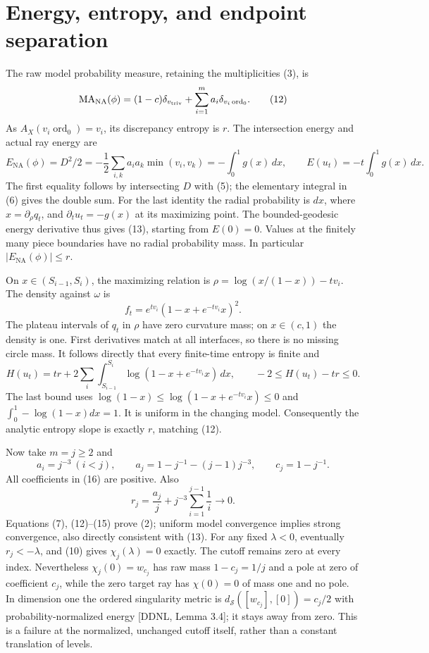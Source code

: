 \documentclass[11pt]{article}
\newcommand{\MA}{\operatorname{MA}}
\newcommand{\NA}{\mathrm{NA}}
\newcommand{\ord}{\operatorname{ord}}
\begin{document}
\section{Energy, entropy, and endpoint separation}
The raw model probability measure, retaining the multiplicities (3), is
\[
 \MA_\NA(\phi)=(1-c)\delta_{v_{\rm triv}}
                       +\sum_{i=1}^m a_i\delta_{v_i\ord_0}.
 \tag{12}
\]
As $A_X(v_i\ord_0)=v_i$, its discrepancy entropy is $r$.
The intersection energy and actual ray energy are
\[
 E_\NA(\phi)=D^2/2
    =-\frac12\sum_{i,k}a_ia_k\min(v_i,v_k)
    =-\int_0^1g(x)\,dx,
 \qquad E(u_t)=-t\int_0^1g(x)\,dx .                    \tag{13}
\]
The first equality follows by intersecting $D$ with (5);
the elementary integral in (6) gives the double sum.
For the last identity the radial probability is $dx$, where
$x=\partial_\rho q_t$, and $\partial_tu_t=-g(x)$ at its maximizing
point. The bounded-geodesic energy derivative thus gives (13), starting
from $E(0)=0$. Values at the finitely many piece boundaries have no
radial probability mass. In particular $|E_\NA(\phi)|\leq r$.

On $x\in(S_{i-1},S_i)$, the maximizing relation is
$\rho=\log(x/(1-x))-tv_i$. The density against $\omega$ is
\[
 f_t=e^{tv_i}(1-x+e^{-tv_i}x)^2.                         \tag{14}
\]
The plateau intervals of $q_t$ in $\rho$ have zero curvature mass;
on $x\in(c,1)$ the density is one. First derivatives match at all
interfaces, so there is no missing circle mass. It follows directly
that every finite-time entropy is finite and
\[
 H(u_t)=tr+2\sum_i\int_{S_{i-1}}^{S_i}
                       \log(1-x+e^{-tv_i}x)\,dx,
 \qquad -2\leq H(u_t)-tr\leq0.                          \tag{15}
\]
The last bound uses $\log(1-x)\leq\log(1-x+e^{-tv_i}x)\leq0$
and $\int_0^1-\log(1-x)dx=1$. It is uniform in the changing model.
Consequently the analytic entropy slope is exactly $r$, matching (12).

Now take $m=j\geq2$ and
\[
 a_i=j^{-3}\ (i<j),\qquad
 a_j=1-j^{-1}-(j-1)j^{-3},\qquad c_j=1-j^{-1}.           \tag{16}
\]
All coefficients in (16) are positive. Also
\[
 r_j=\frac{a_j}{j}+j^{-3}\sum_{i=1}^{j-1}\frac1i\to0.
\]
Equations (7), (12)--(15) prove (2); uniform model convergence implies
strong convergence, also directly consistent with (13).
For any fixed $\lambda<0$, eventually $r_j<-\lambda$, and (10) gives
$\chi_j(\lambda)=0$ exactly. The cutoff remains zero at every index.
Nevertheless $\chi_j(0)=w_{c_j}$ has raw mass $1-c_j=1/j$ and
a pole at zero of coefficient $c_j$, while the zero target ray has
$\chi(0)=0$ of mass one and no pole. In dimension one the ordered
singularity metric is $d_{\mathcal S}([w_{c_j}],[0])=c_j/2$
with probability-normalized energy [DDNL, Lemma 3.4]; it stays away
from zero. This is a failure at the normalized, unchanged cutoff itself,
rather than a constant translation of levels.
\end{document}
